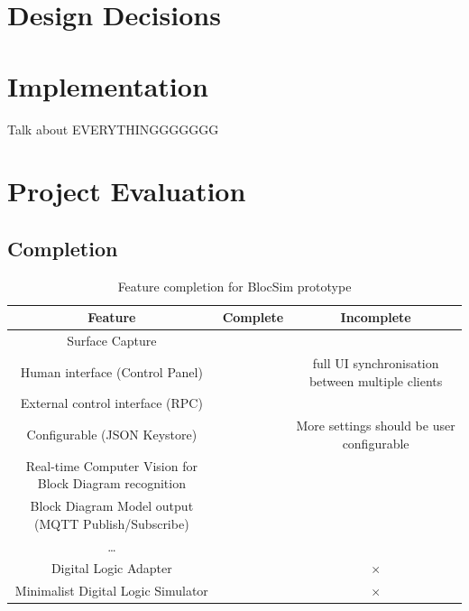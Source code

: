 \documentclass[titlesmallcaps, examinerscopy, copyrightpage]{uqthesis}
\newcommand{\tick}{\checkmark}
\newcommand{\gtick}{\color{ForestGreen} \tick }
\newcommand{\cross}{$\times$ }
\newcommand{\rcross}{\color{red} \cross }
\begin{document}
\chapter{Design Decisions}
\label{ch:design}



\chapter{Implementation}
\label{ch:impl}

Talk about EVERYTHINGGGGGGG



\chapter{Project Evaluation}

\section{Completion}



\begin{table}[ht!]
	\center
	\begin{tabular}{c|c|c}
		\hline
		Feature & Complete & Incomplete \\
		\hline
		Surface Capture & \gtick & \\
		Human interface (Control Panel) & \gtick & full UI synchronisation between multiple clients \\
		External control interface (RPC) & \gtick & \\
		Configurable (JSON Keystore) & \gtick & More settings should be user configurable \\
		Real-time Computer Vision for \newline Block Diagram recognition & \gtick & \\
		Block Diagram Model output \newline (MQTT Publish/Subscribe) & \gtick & \\
		\ldots & & \\
		Digital Logic Adapter & & \rcross \\
		Minimalist Digital Logic Simulator & & \rcross \\
		\hline
	\end{tabular}
	\caption{Feature completion for BlocSim prototype}
	\label{tab:completion}
\end{table} 

\newpage
\end{document}
